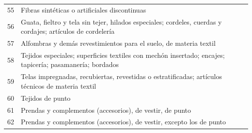 \documentclass[a4paper,openright,12pt]{book}
\begin{document}
\begin{table}[]
{\begin{tabular}{@{}ll@{}}
    55  & Fibras sintéticas o artificiales discontinuas                                                                                                                                                                                                                                                  \\
    56  & Guata, fieltro y tela sin tejer, hilados especiales; cordeles, cuerdas y cordajes; artículos de cordelería                                                                                                                                                                                     \\
    57  & Alfombras y demás revestimientos para el suelo, de materia textil                                                                                                                                                                                                                              \\
    58  & Tejidos especiales; superficies textiles con mechón insertado; encajes; tapicería; pasamanería; bordados                                                                                                                                                                                       \\
    59  & Telas impregnadas, recubiertas, revestidas o estratificadas; artículos técnicos de materia textil                                                                                                                                                                                              \\
    60  & Tejidos de punto                                                                                                                                                                                                                                                                               \\
    61  & Prendas y complementos (accesorios), de vestir, de punto                                                                                                                                                                                                                                       \\
    62  & Prendas y complementos (accesorios), de vestir, excepto los de punto                                                                                                                                                                                                                           \\

\end{tabular}}
\end{table}
\end{document}
